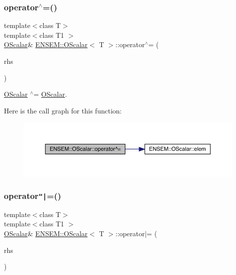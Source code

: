 \subsubsection{\texorpdfstring{operator$^\wedge$=()}{operator^=()}\hspace{0.1cm}{\footnotesize\ttfamily [3/3]}}
{\footnotesize\ttfamily template$<$class T$>$ \\
template$<$class T1 $>$ \\
\mbox{\hyperlink{classENSEM_1_1OScalar}{O\+Scalar}}\& \mbox{\hyperlink{classENSEM_1_1OScalar}{E\+N\+S\+E\+M\+::\+O\+Scalar}}$<$ T $>$\+::operator$^\wedge$= (\begin{DoxyParamCaption}\item[{const \mbox{\hyperlink{classENSEM_1_1OScalar}{O\+Scalar}}$<$ T1 $>$ \&}]{rhs }\end{DoxyParamCaption})\hspace{0.3cm}{\ttfamily [inline]}}



\mbox{\hyperlink{classENSEM_1_1OScalar}{O\+Scalar}} $^\wedge$= \mbox{\hyperlink{classENSEM_1_1OScalar}{O\+Scalar}}. 

Here is the call graph for this function\+:
\nopagebreak
\begin{figure}[H]
\begin{center}
\leavevmode
\includegraphics[width=350pt]{da/d80/classENSEM_1_1OScalar_af66decef8e6be220193ad1292a927e2f_cgraph}
\end{center}
\end{figure}
\mbox{\label{classENSEM_1_1OScalar_aeffba612ea04593253d41332d6d2aa82}} 
\subsubsection{\texorpdfstring{operator\texttt{"|}=()}{operator|=()}\hspace{0.1cm}{\footnotesize\ttfamily [1/3]}}
{\footnotesize\ttfamily template$<$class T$>$ \\
template$<$class T1 $>$ \\
\mbox{\hyperlink{classENSEM_1_1OScalar}{O\+Scalar}}\& \mbox{\hyperlink{classENSEM_1_1OScalar}{E\+N\+S\+E\+M\+::\+O\+Scalar}}$<$ T $>$\+::operator$\vert$= (\begin{DoxyParamCaption}\item[{const \mbox{\hyperlink{classENSEM_1_1OScalar}{O\+Scalar}}$<$ T1 $>$ \&}]{rhs }\end{DoxyParamCaption})\hspace{0.3cm}{\ttfamily [inline]}}



